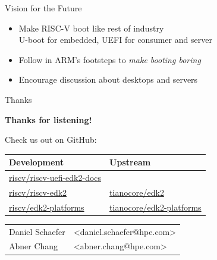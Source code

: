 \documentclass[
  10pt
]{beamer}
\begin{document}
\begin{frame}{Vision for the Future}
  \begin{itemize}
    \item Make RISC-V boot like rest of industry \\
          U-boot for embedded, UEFI for consumer and server
    \item Follow in ARM's footsteps to \textit{make booting boring}
    \item Encourage discussion about desktops and servers
  \end{itemize}
\end{frame}

\begin{frame}{Thanks}
  \begin{center}
    \textbf{Thanks for listening!}
  \end{center}

  \vfill

  Check us out on GitHub: \\

  \begin{tabular}{ll}
    Development & Upstream \\
    \hline
    \href{https://github.com/riscv/riscv-uefi-edk2-docs}{riscv/riscv-uefi-edk2-docs} \\
    \href{https://github.com/riscv/riscv-edk2}{riscv/riscv-edk2} & \href{https://github.com/tianocore/edk2}{tianocore/edk2} \\
    \href{https://github.com/riscv/riscv-edk2-platforms}{riscv/edk2-platforms} & \href{https://github.com/tianocore/edk2-platforms}{tianocore/edk2-platforms} \\
  \end{tabular}

  \vfill

  \begin{tabular}{ll}
    Daniel Schaefer & <daniel.schaefer@hpe.com> \\
    Abner Chang     & <abner.chang@hpe.com> \\
  \end{tabular}
\end{frame}

\end{document}
